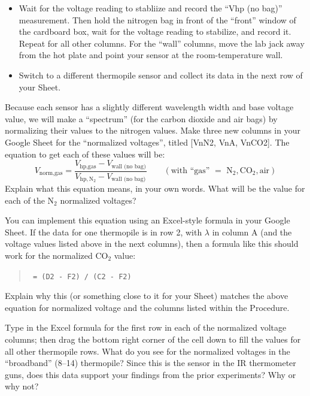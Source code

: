 \begin{itemize}
	\item Wait for the voltage reading to stabliize and record the ``Vhp (no bag)'' measurement.  Then hold the nitrogen bag in front of the ``front'' window of the cardboard box, wait for the voltage reading to stabilize, and record it.  Repeat for all other columns.  For the ``wall'' columns, move the lab jack away from the hot plate and point your sensor at the room-temperature wall.
	\item Switch to a different thermopile sensor and collect its data in the next row of your Sheet.
	\end{itemize}


   Because each sensor has a slightly different wavelength width and base voltage value, we will make a ``spectrum'' (for the carbon dioxide and air bags) by normalizing their values to the nitrogen values.  Make three new columns in your Google Sheet for the ``normalized voltages'', titled [VnN2, VnA, VnCO2]. The equation to get each of these values will be:
	\begin{equation*}
	V_{\text{norm}, \text{gas}} = \frac{ V_{\text{hp}, \text{gas}} - V_{\text{wall (no bag)}} }{ V_{\text{hp}, \text{N}_2} - V_{\text{wall (no bag)}} }
	\quad \quad \left( \text{with ``gas'' } = \text{ N}_2, \text{CO}_2, \text{air}\right)
	\end{equation*}
Explain what this equation means, in your own words.  What will be the value for each of the $\text{N}_2$ normalized voltages?

\answerspace

\noindent You can implement this equation using an Excel-style formula in your Google Sheet.  If the data for one thermopile is in row 2, with $\lambda$ in column A (and the voltage values listed above in the next columns), then a formula like this should work for the normalized $\text{CO}_2$ value:
	\begin{quote}
	\verb| = (D2 - F2) / (C2 - F2) |
	\end{quote}
Explain why this (or something close to it for your Sheet) matches the above equation for normalized voltage and the columns listed within the Procedure.

\answerspace


\noindent Type in the Excel formula for the first row in each of the normalized voltage columns; then drag the bottom right corner of the cell down to fill the values for all other thermopile rows. What do you see for the normalized voltages in the ``broadband'' (8--\unit{14}{\micro\meter}) thermopile?  Since this is the sensor in the IR thermometer guns, does this data support your findings from the prior experiments?  Why or why not?

